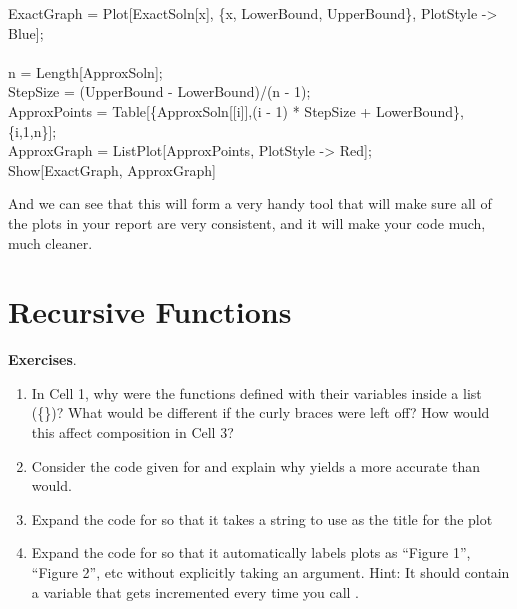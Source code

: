 \begin{code}
	   ExactGraph = Plot[ExactSoln[x], \{x, LowerBound, UpperBound\}, PlotStyle -> Blue];\\
	   \\
	   n = Length[ApproxSoln];\\
	   StepSize = (UpperBound - LowerBound)/(n - 1);\\
	   ApproxPoints = Table[\{ApproxSoln[[i]],(i - 1) * StepSize + LowerBound\},\{i,1,n\}];\\
	   ApproxGraph = ListPlot[ApproxPoints, PlotStyle -> Red];\\
	   Show[ExactGraph, ApproxGraph]
\end{code}

And we can see that this will form a very handy tool that will make sure all of the plots in your report are very consistent, and it will make your code much, much cleaner.

\section{Recursive Functions}


\textbf{Exercises}.
\begin{enumerate}
	   \item In Cell 1, why were the functions defined with their variables inside a list (\{\})? What would be different if the curly braces were left off? How would this affect composition in Cell 3?
	   \item Consider the code given for  and explain why  yields a more accurate  than  would.
	   \item Expand the code for  so that it takes a string to use as the title for the plot
	   \item Expand the code for  so that it automatically labels plots as ``Figure 1'', ``Figure 2'', etc without explicitly taking an argument. Hint: It should contain a variable that gets incremented every time you call . 
\end{enumerate}
